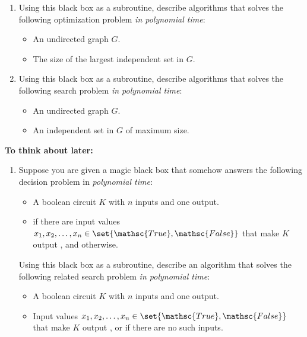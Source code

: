 \documentclass[11pt]{article}
\begin{document}
\begin{enumerate}
\begin{enumerate}\itemsep 2ex
\item
Using this black box as a subroutine, describe algorithms that solves the following optimization problem \emph{in polynomial time}:
\begin{itemize}
\item {} An undirected graph $G$.
\item {} The size of the largest independent set in $G$.
\end{itemize}

\item
Using this black box as a subroutine, describe algorithms that solves the following search problem \emph{in polynomial time}:
\begin{itemize}
\item {} An undirected graph $G$.
\item {} An independent set in $G$ of maximum size.
\end{itemize}
\end{enumerate}


\end{enumerate}

\newpage

\noindent
\textbf{To think about later:}

\begin{enumerate}\parindent 1.5em\itemsep4ex
\setcounter{enumi}{2}

\item
Suppose you are given a magic black box that somehow answers the following decision problem in \emph{polynomial time}:
\begin{itemize}
\item
{} A boolean circuit $K$ with $n$ inputs and one output.
\item
{}  if there are input values $x_1, x_2, \dots, x_n \in \set{\mathsc{True},\mathsc{False}}$ that make $K$ output , and  otherwise.
\end{itemize}
Using this black box as a subroutine, describe an algorithm that solves the following related search problem \emph{in polynomial time}:
\begin{itemize}
\item {} A boolean circuit $K$ with $n$ inputs and one output.
\item {} Input values $x_1, x_2, \dots, x_n \in \set{\mathsc{True},\mathsc{False}}$ that make $K$ output , or  if there are no such inputs.
\end{itemize}


\end{enumerate}
\end{document}
